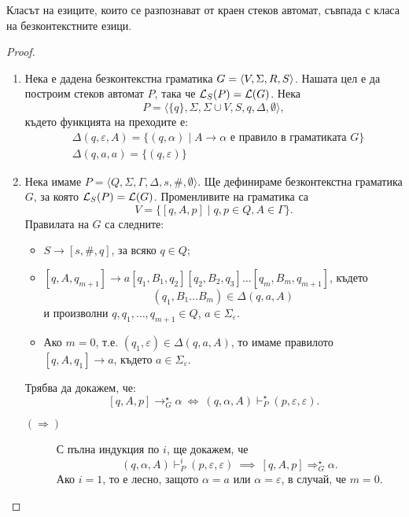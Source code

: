 \begin{framed}
\begin{thm}
  Класът на езиците, които се разпознават от краен стеков автомат, съвпада с
  класа на безконтекстните езици.
\end{thm}
\end{framed}
\begin{proof}
  \begin{enumerate}[1)]
  \item 
    Нека е дадена безконтекстна граматика $G = \langle{V,\Sigma,R,S}\rangle$.
    Нашата цел е да построим стеков автомат $P$, така че $\mathcal{L}_S(P) = \mathcal{L}(G)$.
    Нека  \[P = \langle{\{q\},\Sigma,\Sigma\cup V,S,q,\Delta,\emptyset}\rangle,\]
    където функцията на преходите е:
    \begin{align*}
      & \Delta(q,\varepsilon,A) = \{(q,\alpha)\mid A\to\alpha\mbox{ е правило в граматиката }G\}\\
      & \Delta(q,a,a) = \{(q,\varepsilon)\}
    \end{align*}
  \item
    Нека имаме $P = \langle{Q, \Sigma, \Gamma, \Delta, s, \#, \emptyset}\rangle$.
    Ще дефинираме безконтекстна граматика $G$, за която $\mathcal{L}_S(P) = \mathcal{L}(G)$.
    Променливите на граматика са 
    \[V = \{[q,A,p] \mid q,p \in Q, A \in \Gamma\}.\]
    Правилата на $G$ са следните:
    \begin{itemize}
    \item
      $S \to [s,\#,q]$, за всяко $q \in Q$;
    \item
      $[q,A,q_{m+1}] \to a[q_1,B_1,q_2][q_2,B_2,q_3]\dots [q_m,B_m,q_{m+1}]$,
      където 
      \[(q_1,B_1\dots B_m) \in \Delta(q, a, A)\]
      и произволни $q,q_1,\dots,q_{m+1} \in Q$,
      $a \in \Sigma_\varepsilon$.
    \item
      Ако $m = 0$, т.е. $(q_1,\varepsilon) \in \Delta(q, a, A)$,  то имаме правилото $[q,A,q_{1}] \to a$, където $a \in \Sigma_\varepsilon$.
    \end{itemize}
    Трябва да докажем, че:
    \[[q,A,p] \rightarrow^\star_G \alpha\ \iff\ (q,\alpha,A) \vdash^\star_P (p,\varepsilon,\varepsilon).\]
    \begin{description}
    \item[$(\Rightarrow)$]
      С пълна индукция по $i$, ще докажем, че 
      \[(q,\alpha,A) \vdash^i_P (p,\varepsilon,\varepsilon)\ \implies\ [q,A,p] \Rightarrow^\star_G \alpha.\]
      Ако $i = 1$, то е лесно, защото $\alpha = a$ или $\alpha = \varepsilon$, в случай, че $m = 0$.

\end{description}
\end{enumerate}
\end{proof}

